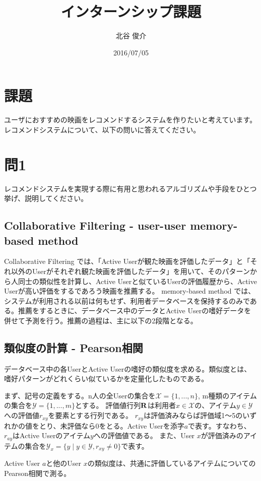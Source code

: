\documentclass[11pt,a4j]{jsarticle}
\title{インターンシップ課題}
\author{北谷 俊介}
\date{2016/07/05}
\begin{document}
  \maketitle

  \section*{課題}
  ユーザにおすすめの映画をレコメンドするシステムを作りたいと考えています。
  レコメンドシステムについて、以下の問いに答えてください。

  \section*{問1}
  レコメンドシステムを実現する際に有用と思われるアルゴリズムや手段をひとつ挙げ、説明してください。
    \subsection*{Collaborative Filtering - user-user memory-based method}
    Collaborative Filtering では、「Active Userが観た映画を評価したデータ」と「それ以外のUserがそれぞれ観た映画を評価したデータ」を用いて、そのパターンから人同士の類似性を計算し、Active Userと似ているUserの評価履歴から、Active Userが高い評価をするであろう映画を推薦する。
    memory-based method では、システムが利用される以前は何もせず、利用者データベースを保持するのみである。推薦をするときに、データベース中のデータとActive Userの嗜好データを併せて予測を行う。推薦の過程は、主に以下の2段階となる。

    \subsection*{類似度の計算 - Pearson相関}
    データベース中の各UserとActive Userの嗜好の類似度を求める。類似度とは、嗜好パターンがどれくらい似ているかを定量化したものである。

    まず、記号の定義をする。n人の全Userの集合を$\mathcal{X} = \{1, ... ,n\}$, m種類のアイテムの集合を$\mathcal{Y} = \{1, ... ,m\}$とする。
    評価値行列$\bf{R}$は利用者$x \in \mathcal{X}$の、アイテム$y \in \mathcal{Y}$への評価値$r_{xy}$を要素とする行列である。
    $r_{xy}$は評価済みならば評価域1〜5のいずれかの値をとり、未評価なら0をとる。Active Userを添字$a$で表す。すなわち、$r_{ay}$はActive Userのアイテム$y$への評価値である。
    また、User $x$が評価済みのアイテムの集合を$\mathcal{Y}_{x} = \{y \mid y \in \mathcal{Y}, r_{xy} \neq 0\}$で表す。

    Active User $a$と他のUser $x$の類似度は、共通に評価しているアイテムについてのPearson相関で測る。
\end{document}
